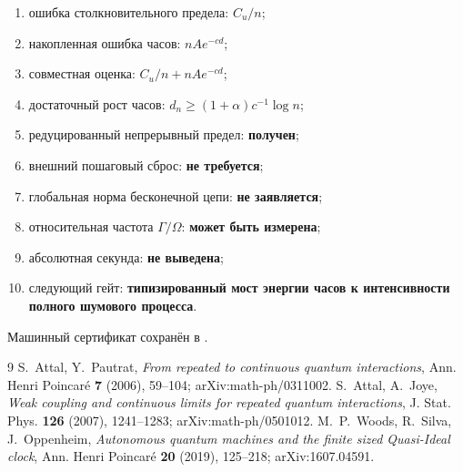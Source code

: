 \begin{protocol}
\begin{enumerate}
 \item ошибка столкновительного предела: \textbf{$C_u/n$};
 \item накопленная ошибка часов: \textbf{$nAe^{-cd}$};
 \item совместная оценка: \textbf{$C_u/n+nAe^{-cd}$};
 \item достаточный рост часов: \textbf{$d_n\geq(1+\alpha)c^{-1}\log n$};
 \item редуцированный непрерывный предел: \textbf{получен};
 \item внешний пошаговый сброс: \textbf{не требуется};
 \item глобальная норма бесконечной цепи: \textbf{не заявляется};
 \item относительная частота $\Gamma/\Omega$: \textbf{может быть измерена};
 \item абсолютная секунда: \textbf{не выведена};
 \item следующий гейт: \textbf{типизированный мост энергии часов к
 интенсивности полного шумового процесса}.
\end{enumerate}
\end{protocol}

Машинный сертификат сохранён в
.

\begin{thebibliography}{9}
S.~Attal, Y.~Pautrat,
\emph{From repeated to continuous quantum interactions},
Ann. Henri Poincar\'e \textbf{7} (2006), 59--104;
arXiv:math-ph/0311002.
S.~Attal, A.~Joye,
\emph{Weak coupling and continuous limits for repeated quantum interactions},
J. Stat. Phys. \textbf{126} (2007), 1241--1283;
arXiv:math-ph/0501012.
M.~P.~Woods, R.~Silva, J.~Oppenheim,
\emph{Autonomous quantum machines and the finite sized Quasi-Ideal clock},
Ann. Henri Poincar\'e \textbf{20} (2019), 125--218;
arXiv:1607.04591.
\end{thebibliography}